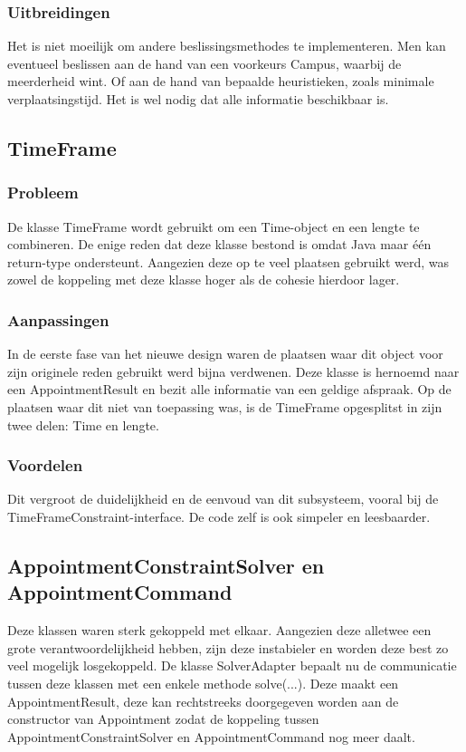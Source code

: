\subsubsection{Uitbreidingen}
Het is niet moeilijk om andere beslissingsmethodes te implementeren. 
Men kan eventueel beslissen aan de hand van een voorkeurs Campus, waarbij de meerderheid wint. 
Of aan de hand van bepaalde heuristieken, zoals minimale verplaatsingstijd.
Het is wel nodig dat alle informatie beschikbaar is.

\subsection{TimeFrame}
\subsubsection{Probleem}
De klasse TimeFrame wordt gebruikt om een Time-object en een lengte te combineren. 
De enige reden dat deze klasse bestond is omdat Java maar één return-type ondersteunt. 
Aangezien deze op te veel plaatsen gebruikt werd, was zowel de koppeling met deze klasse hoger als de cohesie hierdoor lager. 

\subsubsection{Aanpassingen}
In de eerste fase van het nieuwe design waren de plaatsen waar dit object voor zijn originele reden gebruikt werd bijna verdwenen. 
Deze klasse is hernoemd naar een AppointmentResult en bezit alle informatie van een geldige afspraak. 
Op de plaatsen waar dit niet van toepassing was, is de TimeFrame opgesplitst in zijn twee delen: Time en lengte.

\subsubsection{Voordelen}
Dit vergroot de duidelijkheid en de eenvoud van dit subsysteem, vooral bij de TimeFrameConstraint-interface. 
De code zelf is ook simpeler en leesbaarder. 

\subsection{AppointmentConstraintSolver en AppointmentCommand}
Deze klassen waren sterk gekoppeld met elkaar. 
Aangezien deze alletwee een grote verantwoordelijkheid hebben, zijn deze instabieler en worden deze best zo veel mogelijk losgekoppeld. 
De klasse SolverAdapter bepaalt nu de communicatie tussen deze klassen met een enkele methode solve(...). 
Deze maakt een AppointmentResult, deze kan rechtstreeks doorgegeven worden aan de constructor van Appointment zodat de koppeling tussen AppointmentConstraintSolver en AppointmentCommand nog meer daalt. 

